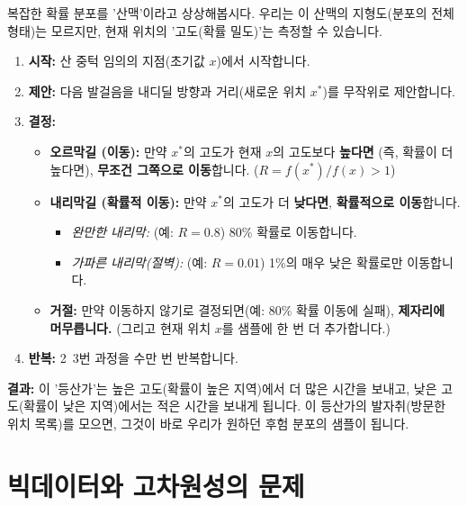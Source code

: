 \documentclass[11pt,a4paper]{book}
\theoremstyle{definition}
\begin{document}
\begin{analogybox}[title={메트로폴리스-헤이스팅스: 안대 쓴 등산가}]
복잡한 확률 분포를 '산맥'이라고 상상해봅시다. 우리는 이 산맥의 지형도(분포의 전체 형태)는 모르지만, 현재 위치의 '고도(확률 밀도)'는 측정할 수 있습니다.

\begin{enumerate}
    \item \textbf{시작:} 산 중턱 임의의 지점(초기값 $x$)에서 시작합니다.
    \item \textbf{제안:} 다음 발걸음을 내디딜 방향과 거리(새로운 위치 $x^*$)를 무작위로 제안합니다.
    \item \textbf{결정:}
        \begin{itemize}
            \item \textbf{오르막길 (이동):} 만약 $x^*$의 고도가 현재 $x$의 고도보다 \textbf{높다면} (즉, 확률이 더 높다면), \textbf{무조건 그쪽으로 이동}합니다. ($R = f(x^*) / f(x) > 1$)
            \item \textbf{내리막길 (확률적 이동):} 만약 $x^*$의 고도가 더 \textbf{낮다면}, \textbf{확률적으로 이동}합니다.
                \begin{itemize}
                    \item \textit{완만한 내리막:} (예: $R=0.8$) 80\% 확률로 이동합니다.
                    \item \textit{가파른 내리막(절벽):} (예: $R=0.01$) 1\%의 매우 낮은 확률로만 이동합니다.
                \end{itemize}
            \item \textbf{거절:} 만약 이동하지 않기로 결정되면(예: 80\% 확률 이동에 실패), \textbf{제자리에 머무릅니다.} (그리고 현재 위치 $x$를 샘플에 한 번 더 추가합니다.)
        \end{itemize}
    \item \textbf{반복:} 2~3번 과정을 수만 번 반복합니다.
\end{enumerate}
\textbf{결과:} 이 '등산가'는 높은 고도(확률이 높은 지역)에서 더 많은 시간을 보내고, 낮은 고도(확률이 낮은 지역)에서는 적은 시간을 보내게 됩니다. 이 등산가의 발자취(방문한 위치 목록)를 모으면, 그것이 바로 우리가 원하던 후험 분포의 샘플이 됩니다.
\end{analogybox}


\section{빅데이터와 고차원성의 문제}
\end{document}
